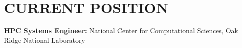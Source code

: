 \section{CURRENT POSITION}
\vspace{0.03in}
{\bf HPC Systems Engineer:} 
National Center for Computational Sciences,
Oak Ridge National Laboratory

